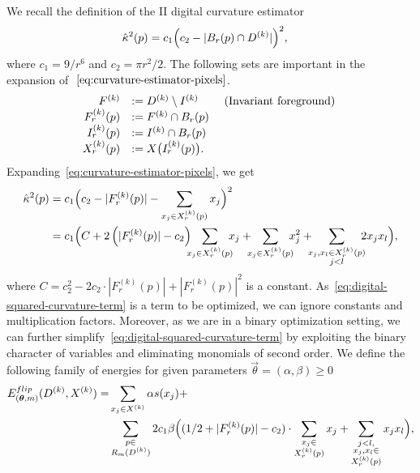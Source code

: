 We recall the definition of the II digital curvature estimator 
\begin{align}
	\hat{\kappa}^2(p) &= c_1\Big( c_2 - | B_r(p) \cap D^{(k)} | \Big)^2, 
	\label{eq:curvature-estimator-pixels}
\end{align}
where $c_1=9/r^6$ and $c_2=\pi r^2/2$. 
%
The following sets are important in the expansion of $~\cref{eq:curvature-estimator-pixels}$.
\begin{align*}
	\begin{array}{rll}
	F^{(k)} &:= D^{(k)} \setminus I^{(k)} & \text{ {\color{black}{(Invariant foreground) }}} \\
	F_r^{(k)}(p) &:= F^{(k)} \cap B_r(p) &\\
	I_r^{(k)}(p) &:= I^{(k)} \cap B_r(p) & \\
	X_r^{(k)}(p) &:= X\big( I_r^{(k)}(p) \big). & \\	
	\end{array}
\end{align*}
%
%
Expanding~\cref{eq:curvature-estimator-pixels}, we get 
\begin{align}
  \hat{\kappa}^2(p) &= c_1\Big( c_2 - |F_{r}^{(k)}(p)| - \sum_{x_j \in X_r^{(k)}(p)} {x_j} \Big)^2 \nonumber \\
   &= c_1 \Big( C + 2\left( |F_{r}^{(k)}(p)| - c_2 \right) \hspace{-2mm}\sum_{x_j \in X_{r}^{(k)}(p)}\hspace{-2mm}{x_j} + \hspace{-2mm}\sum_{x_j \in X_{r}^{(k)}(p)}\hspace{-2mm}{x_j^2} + \hspace{-2mm}\sum_{ \substack{x_j,x_l \in X_{r}^{(k)}(p) \\ j<l} }\hspace{-2mm}{2x_jx_l}  \Big),
   \label{eq:digital-squared-curvature-term}
\end{align}
where $C=c_2^2 - 2c_2 \cdot |F_{r}^{(k)}(p)| + |F_{r}^{(k)}(p)|^2$ is a constant. As~\cref{eq:digital-squared-curvature-term} is a term to be optimized, we can ignore constants and multiplication factors. Moreover, as we are in a binary optimization setting, we can  further simplify~\cref{eq:digital-squared-curvature-term} by exploiting the binary character of variables and eliminating monomials of second order. We define the following family
of energies for given parameters $\vec{\theta}=(\alpha,\beta ) \geq 0$ 
\begin{align}
  E_{(\bm{\theta},m)}^{flip}(D^{(k)},X^{(k)}) =& \sum_{x_j \in X^{(k)}}{\alpha s(x_j)} + \nonumber \\ 
  & \sum_{ \substack{p \in \\ {\color{black}{R_m(D^{(k)})}}}}{ 2c_1 \beta  \Big( { (1/2+ |F_{r}^{(k)}(p)|-c_2) \cdot \sum_{ \substack{ x_j \in \\ X_{r}^{(k)}(p)}}{x_j} } + \sum_{ \substack{j<l, \\ x_j,x_l \in \\ X_{r}^{(k)}(p) } }{x_jx_l} \Big) },
  \label{eq:energy-family}
\end{align}
